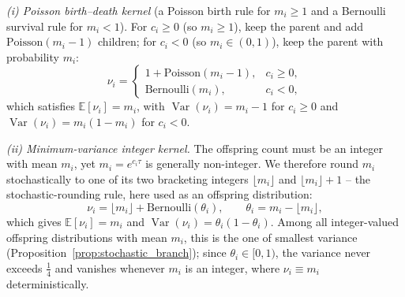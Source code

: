 \documentclass[a4paper,fleqn]{cas-sc}
\theoremstyle{definition}
\theoremstyle{remark}
\begin{document}
\emph{(i) Poisson birth--death kernel} (a Poisson birth rule for $m_i\ge1$ and a Bernoulli survival rule for
$m_i<1$). For $c_i\ge0$ (so $m_i\ge1$), keep the parent and add
$\mathrm{Poisson}(m_i-1)$ children; for $c_i<0$ (so $m_i\in(0,1)$), keep the parent with probability $m_i$:
\begin{equation}\label{equ:poisson_kernel}
\nu_i =
\begin{cases}
1+\mathrm{Poisson}(m_i-1), & c_i\ge 0,\\[2pt]
\mathrm{Bernoulli}(m_i), & c_i<0,
\end{cases}
\end{equation}
which satisfies $\mathbb E[\nu_i]=m_i$, with $\operatorname{Var}(\nu_i)=m_i-1$ for $c_i\ge0$ and
$\operatorname{Var}(\nu_i)=m_i(1-m_i)$ for $c_i<0$.

\emph{(ii) Minimum-variance integer kernel.} The offspring count must be an integer with mean $m_i$, yet
$m_i=e^{c_i\tau}$ is generally non-integer. We therefore round $m_i$ stochastically to one of its two bracketing
integers $\lfloor m_i\rfloor$ and $\lfloor m_i\rfloor+1$ -- the stochastic-rounding rule, here used as an
offspring distribution:
\begin{equation}\label{equ:minvar_kernel}
\nu_i=\lfloor m_i\rfloor + \mathrm{Bernoulli}(\theta_i),
\qquad
\theta_i = m_i-\lfloor m_i\rfloor,
\end{equation}
which gives $\mathbb E[\nu_i]=m_i$ and $\operatorname{Var}(\nu_i)=\theta_i(1-\theta_i)$. Among all
integer-valued offspring distributions with mean $m_i$, this is the one of smallest variance
(Proposition~\ref{prop:stochastic_branch}); since $\theta_i\in[0,1)$, the variance never exceeds $\tfrac14$ and vanishes
whenever $m_i$ is an integer, where $\nu_i\equiv m_i$ deterministically.
\end{document}
